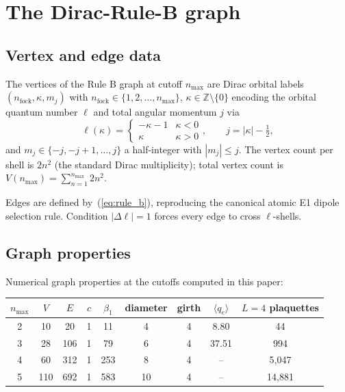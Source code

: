 \documentclass[11pt]{article}
\begin{document}
\section{The Dirac-Rule-B graph}
\label{sec:rule_b}

\subsection{Vertex and edge data}
\label{sec:rule_b_data}

The vertices of the Rule B graph at cutoff $n_\text{max}$ are Dirac orbital labels
$(n_\text{fock},\kappa,m_j)$ with $n_\text{fock}\in\{1,2,\ldots,n_\text{max}\}$,
$\kappa\in\mathbb{Z}\setminus\{0\}$ encoding the orbital quantum number $\ell$
and total angular momentum $j$ via
\begin{equation}
\ell(\kappa)=\begin{cases}-\kappa-1 & \kappa<0\\ \kappa & \kappa>0\end{cases},
\qquad j=|\kappa|-\tfrac12,
\end{equation}
and $m_j\in\{-j,-j+1,\ldots,j\}$ a half-integer with $|m_j|\le j$. The vertex
count per shell is $2n^2$ (the standard Dirac multiplicity); total vertex count is
$V(n_\text{max})=\sum_{n=1}^{n_\text{max}}2n^2$.

Edges are defined by~(\ref{eq:rule_b}), reproducing the canonical atomic E1
dipole selection rule. Condition $|\Delta\ell|=1$ forces every edge to cross
$\ell$-shells.

\subsection{Graph properties}
\label{sec:graph_props}

Numerical graph properties at the cutoffs computed in this paper:

\begin{center}
\begin{tabular}{ccccccccc}
\toprule
$n_\text{max}$ & $V$ & $E$ & $c$ & $\beta_1$ & diameter & girth &
$\langle q_e\rangle$ & $L=4$ plaquettes \\
\midrule
2 & 10  & 20  & 1 & 11  & 4 & 4 & 8.80  & 44 \\
3 & 28  & 106 & 1 & 79  & 6 & 4 & 37.51 & 994 \\
4 & 60  & 312 & 1 & 253 & 8 & 4 & --    & 5{,}047 \\
5 & 110 & 692 & 1 & 583 & 10 & 4 & --   & 14{,}881 \\
\bottomrule
\end{tabular}
\end{center}
\end{document}
